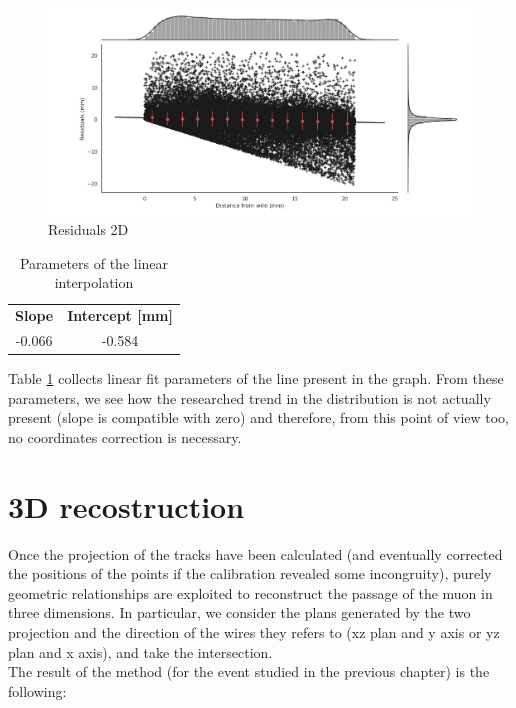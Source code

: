\documentclass[a4paper,11pt]{book}
\begin{document}
\begin{figure}[hbtp]
\centering
\includegraphics[scale=0.4]{pictures/Residuals_2D.pdf}
\caption{Residuals 2D}
\label{fig:res2D}
\end{figure}

\begin{table}[!h]
\centering
\begin{tabular}{c  c}
\toprule
 \textbf{Slope} & \textbf{Intercept [mm]}\\
-0.066 & -0.584 \\
\bottomrule
\end{tabular}
\caption{Parameters of the linear interpolation}
\label{tab:res2D_analysis}
\end{table}

Table \ref{tab:res2D_analysis} collects linear fit parameters of the line present in the graph. From these parameters, we see how the researched trend in the distribution is not actually present (slope is compatible with zero) and therefore, from this point of view too, no coordinates correction is necessary.\\


\section{3D recostruction}

Once the projection of the tracks have been calculated (and eventually corrected the positions of the points if the calibration revealed some incongruity), purely geometric relationships are exploited to reconstruct the passage of the muon in three dimensions. In particular, we consider the plans generated by the two projection and the direction of the wires they refers to (xz plan and y axis or yz plan and x axis), and take the intersection.\\
The result of the method (for the event studied in the previous chapter) is the following:
\end{document}
